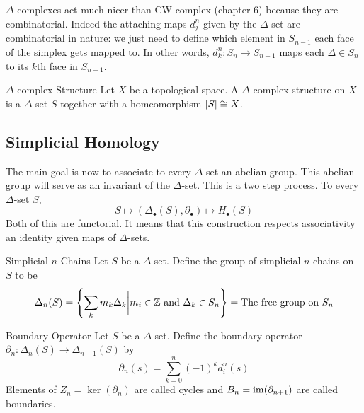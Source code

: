 \documentclass[a4paper]{article}
\begin{document}
$\Delta$-complexes act much nicer than CW complex (chapter $6$) because they are combinatorial. Indeed the attaching maps $d_j^n$ given by the $\Delta$-set are combinatorial in nature: we just need to define which element in $S_{n-1}$ each face of the simplex gets mapped to. In other words, $d_k^n:S_n\to S_{n-1}$ maps each $\Delta\in S_n$ to its $k$th face in $S_{n-1}$. 

\begin{defn}{$\Delta$-complex Structure}{} Let $X$ be a topological space. A $\Delta$-complex structure on $X$ is a $\Delta$-set $S$ together with a homeomorphism $\abs{S}\cong X$. 
\end{defn}

\subsection{Simplicial Homology}
The main goal is now to associate to every $\Delta$-set an abelian group. This abelian group will serve as an invariant of the $\Delta$-set. This is a two step process. To every $\Delta$-set $S$, $$S\mapsto(\Delta_\bullet(S),\partial_\bullet)\mapsto H_\bullet(S)$$ Both of this are functorial. It means that this construction respects associativity an identity given maps of $\Delta$-sets. 

\begin{defn}{Simplicial $n$-Chains}{} Let $S$ be a $\Delta$-set. Define the group of simplicial $n$-chains on $S$ to be $$\Delta_n(S)=\left\{\sum_km_k\Delta_k\bigg{|}m_i\in\mathbb{Z}\text{ and }\Delta_k\in S_n\right\}=\text{The free group on }S_n$$
\end{defn}

\begin{defn}{Boundary Operator}{} Let $S$ be a $\Delta$-set. Define the boundary operator $\partial_n:\Delta_n(S)\to\Delta_{n-1}(S)$ by $$\partial_n(s)=\sum_{k=0}^n(-1)^kd_i^n(s)$$
Elements of $Z_n=\ker(\partial_n)$ are called cycles and $B_n=\operatorname{im}(\partial_{n+1})$ are called boundaries. 
\end{defn}
\end{document}
